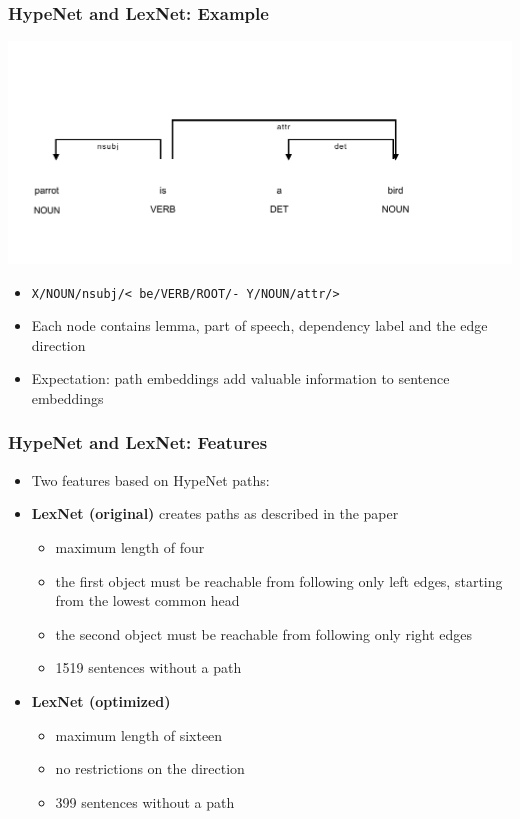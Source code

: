 \documentclass[11pt,aspectratio=169,usenames,dvipsnames]{beamer}
\begin{document}
    \begin{frame}[t]
        \frametitle{HypeNet and LexNet: Example}
        \begin{center}
            \includegraphics[scale=0.7,trim={0cm 0.5cm 0cm 0.25cm},clip]{images/hypenet_example}
        \end{center}

        \begin{itemize}
            \item \texttt{X/NOUN/nsubj/< be/VERB/ROOT/- Y/NOUN/attr/>}
            \item Each node contains lemma, part of speech, dependency label and the edge direction
            \item Expectation: path embeddings add valuable information to sentence embeddings

        \end{itemize}
    \end{frame}


    \begin{frame}[t]
        \frametitle{HypeNet and LexNet: Features}
        \begin{itemize}
            \item Two features based on HypeNet paths:\pause
            \item \textbf{LexNet (original)} creates paths as described in the paper
            \begin{itemize}
                \item maximum length of four
                \item the first object must be reachable from following only left edges, starting from the lowest common head
                \item the second object must be reachable from following only right edges 
                \item 1519 sentences without a path\pause
            \end{itemize}
            \item \textbf{LexNet (optimized)}
            \begin{itemize}
                \item maximum length of sixteen
                \item no restrictions on the direction
                \item 399 sentences without a path
            \end{itemize}
        \end{itemize}
    \end{frame}
\end{document}
